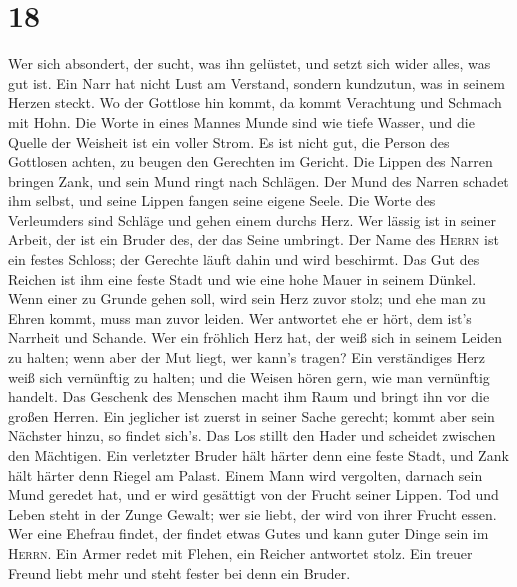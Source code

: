 \hypertarget{section-17}{%
\section{18}\label{section-17}}

 Wer sich absondert, der sucht, was ihn gelüstet, und
setzt sich wider alles, was gut ist.  Ein Narr hat nicht
Lust am Verstand, sondern kundzutun, was in seinem Herzen steckt.
 Wo der Gottlose hin kommt, da kommt Verachtung und
Schmach mit Hohn.  Die Worte in eines Mannes Munde sind
wie tiefe Wasser, und die Quelle der Weisheit ist ein voller Strom.
 Es ist nicht gut, die Person des Gottlosen achten, zu
beugen den Gerechten im Gericht.  Die Lippen des Narren
bringen Zank, und sein Mund ringt nach Schlägen.  Der Mund
des Narren schadet ihm selbst, und seine Lippen fangen seine eigene
Seele.  Die Worte des Verleumders sind Schläge und gehen
einem durchs Herz.  Wer lässig ist in seiner Arbeit, der
ist ein Bruder des, der das Seine umbringt.  Der Name des
\textsc{Herrn} ist ein festes Schloss; der Gerechte läuft dahin und wird
beschirmt.  Das Gut des Reichen ist ihm eine feste Stadt
und wie eine hohe Mauer in seinem Dünkel.  Wenn einer zu
Grunde gehen soll, wird sein Herz zuvor stolz; und ehe man zu Ehren
kommt, muss man zuvor leiden.  Wer antwortet ehe er hört,
dem ist's Narrheit und Schande.  Wer ein fröhlich Herz
hat, der weiß sich in seinem Leiden zu halten; wenn aber der Mut liegt,
wer kann's tragen?  Ein verständiges Herz weiß sich
vernünftig zu halten; und die Weisen hören gern, wie man vernünftig
handelt.  Das Geschenk des Menschen macht ihm Raum und
bringt ihn vor die großen Herren.  Ein jeglicher ist
zuerst in seiner Sache gerecht; kommt aber sein Nächster hinzu, so
findet sich's.  Das Los stillt den Hader und scheidet
zwischen den Mächtigen.  Ein verletzter Bruder hält
härter denn eine feste Stadt, und Zank hält härter denn Riegel am
Palast.  Einem Mann wird vergolten, darnach sein Mund
geredet hat, und er wird gesättigt von der Frucht seiner Lippen.
 Tod und Leben steht in der Zunge Gewalt; wer sie liebt,
der wird von ihrer Frucht essen.  Wer eine Ehefrau
findet, der findet etwas Gutes und kann guter Dinge sein im
\textsc{Herrn}.  Ein Armer redet mit Flehen, ein Reicher
antwortet stolz.  Ein treuer Freund liebt mehr und steht
fester bei denn ein Bruder.

